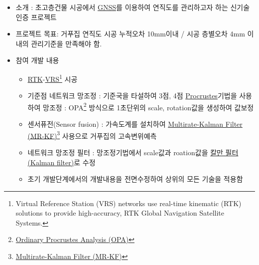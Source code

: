\label{gnss}

\begin{itemize}[label=]
	\item 소개 : 초고층건물 시공에서 \href{http://gnss.ngii.go.kr/info/summary}{GNSS}를 이용하여 연직도를 관리하고자 하는 신기술 인증 프로젝트
	\item 프로젝트 목표: 거푸집 연직도 시공 누적오차 10mm이내 / 시공 층별오차 4mm 이내의 관리기준을 만족해야 함.
	\item 참여 개발 내용
	      \begin{itemize}[label=]
		      \item \href{https://en.wikipedia.org/wiki/Real_Time_Kinematic}{RTK}-\href{https://en.wikipedia.org/wiki/Virtual_Reference_Station}{VRS}\footnote{Virtual Reference Station (VRS) networks use real-time kinematic (RTK) solutions to provide high-accuracy, RTK Global Navigation Satellite Systems.} 시공
		      \item 기준점 네트워크 망조정 : 기준국을 타설하여 3점, 4점 \href{https://en.wikipedia.org/wiki/Procrustes_analysis}{Procrustes}기법을 사용하여 망조정 : OPA\footnote{\href{https://en.wikipedia.org/wiki/Procrustes_analysis}{Ordinary Procrustes Analysis (OPA)}} 방식으로 1초단위의 scale, rotation값을 생성하여 값보정
		      \item 센서퓨전(Sensor fusion) : 가속도계를 설치하여 \href{http://scholar.lib.vt.edu/theses/available/etd-062899-064821/unrestricted/etd.PDF}{Multirate-Kalman Filter (MR-KF)}\footnote{\href{http://scholar.lib.vt.edu/theses/available/etd-062899-064821/unrestricted/etd.PDF}{Multirate-Kalman Filter (MR-KF)}} 사용으로 거푸집의 고속변위예측
		      \item 네트워크 망조정 필터 : 망조정기법에서 scale값과 roation값을 \href{https://ko.wikipedia.org/wiki/\%EC\%B9\%BC\%EB\%A7\%8C_\%ED\%95\%84\%ED\%84\%B0}{칼만 필터(Kalman filter)}로 수정
		      \item 초기 개발단계에서의 개발내용을 전면수정하여 상위의 모든 기술을 적용함


\end{itemize}
\end{itemize}
